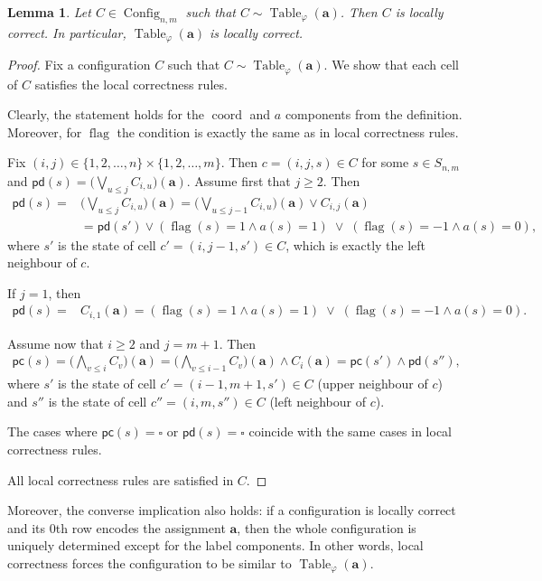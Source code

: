 \documentclass{article}
\theoremstyle{plain}
\newtheorem{lemma}[theorem]{Lemma}
\theoremstyle{definition}
\DeclareMathOperator{\Config}{Config}
\DeclareMathOperator{\Table}{Table}
\DeclareMathOperator{\flag}{flag}
\DeclareMathOperator{\coord}{coord}
\newcommand{\pc}{\mathsf{pc}}
\newcommand{\pd}{\mathsf{pd}}
\newcommand{\tuple}{\mathbf}
\begin{document}
\begin{lemma}\label{lm:table_loc_correct}
    Let $C\in \Config_{n,m}$ such that $C \sim \Table_\varphi(\tuple a)$. Then $C$ is locally correct. In particular, $\Table_\varphi(\tuple a)$ is locally correct.
\end{lemma}
\begin{proof}
Fix a configuration $C$ such that $C \sim \Table_\varphi(\tuple a)$. We show that each cell of $C$ satisfies the local correctness rules.

 Clearly, the statement holds for the $\coord$ and $a$ components from the definition. Moreover, for $\flag$ the condition is exactly the same as in local correctness rules.

 Fix $(i,j) \in \{1,2,\dots,n\}\times\{1,2,\dots,m\}$. Then $c = (i,j,s) \in C$ for some $s \in S_{n,m}$ and $\pd(s) =\bigl(\bigvee_{u\le j} C_{i,u}\bigr)(\tuple a)$. Assume first that $j\geq 2$. Then
 \begin{align*}
      \pd(s) =&\bigl(\bigvee_{u\le j} C_{i,u}\bigr)(\tuple a)  = \bigl(\bigvee_{u\le j-1} C_{i,u}\bigr)(\tuple a) \vee C_{i,j}
 (\tuple a) \\&= \pd(s') \vee (\flag(s)=1 \wedge a(s)=1)
\;\vee\;
(\flag(s)=-1 \wedge a(s)=0),
 \end{align*}
where $s'$ is the state of cell $c' = (i, j-1, s')\in C$, which is exactly the left neighbour of $c$.

If $j=1$, then
 \begin{align*}
      \pd(s) =&C_{i,1}(\tuple a)  =  (\flag(s)=1 \wedge a(s)=1)
\;\vee\;
(\flag(s)=-1 \wedge a(s)=0).
 \end{align*}

 Assume now that $i\ge 2$ and $j=m+1$. Then
 \begin{align*}
     \pc(s) = \bigl(\bigwedge_{v\le i} C_v\bigr)(\tuple a)  = \bigl(\bigwedge_{v\le i-1} C_v\bigr)(\tuple a) \wedge C_i(\tuple a) = \pc(s') \wedge \pd(s''),
 \end{align*}
    where $s'$ is the state of cell $c' = (i-1, m+1, s') \in C$ (upper neighbour of $c$) and $s''$ is the state of cell $c'' = (i, m, s'') \in C$ (left neighbour of $c$).

    The cases where $\pc(s)=\square$ or $\pd(s) = \square$ coincide with the same cases in local correctness rules. 

    All local correctness rules are satisfied in
$C$.
\end{proof}

Moreover, the converse implication also holds: if a configuration is locally correct and its $0$th row encodes the assignment $\tuple a$, then the whole configuration is uniquely determined except for the label components. In other words, local correctness forces the configuration to be similar to $\Table_\varphi(\tuple a)$.
\end{document}

